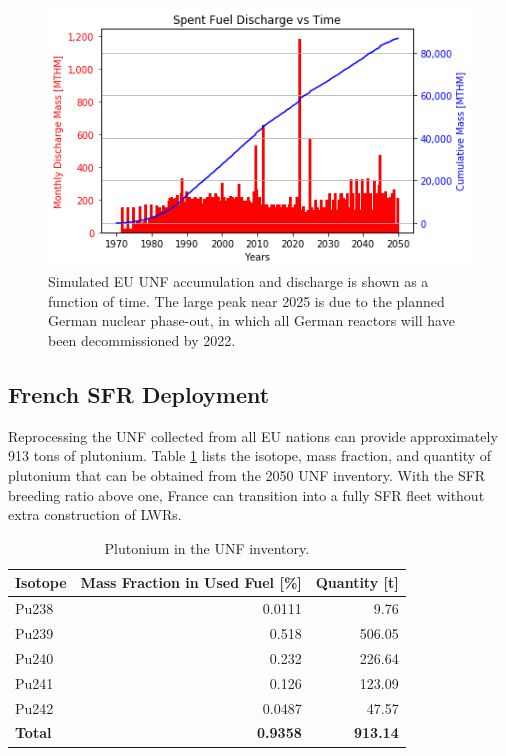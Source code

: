 \begin{figure}[htbp!]
	\begin{center}
			\includegraphics[scale=0.7]{./images/eu_future/snf_discharge.png}
	\end{center}
        \caption{Simulated \gls{EU} \gls{UNF} accumulation and discharge is 
shown as a function of time. The large peak near 2025 is due to the planned German
nuclear phase-out, in which all German reactors will have been decommissioned by 2022.}
	\label{fig:eu_snf}
\end{figure}


\subsection{French \gls{SFR} Deployment}
\FloatBarrier

Reprocessing the \gls{UNF} collected from all EU nations can provide
approximately 913 tons of plutonium. Table \ref{tab:pu} lists the 
isotope, mass fraction, and quantity of plutonium that can be obtained from the 
2050 \gls{UNF} inventory.  With the \gls{SFR} breeding ratio above one, France 
can transition into a fully \gls{SFR} fleet without extra construction of 
\glspl{LWR}. 

\begin{table}[h]
	\centering
	\caption{Plutonium in the \gls{UNF} inventory.}
	\begin{tabular}{lrr}
		\hline
		\textbf{Isotope} & \textbf{Mass Fraction in Used Fuel [\%]} & \textbf{Quantity [t]} \\ \hline
		Pu238 & 0.0111 & 9.76 \\ 
		Pu239 & 0.518 & 506.05 \\ 
		Pu240 & 0.232 & 226.64 \\ 
		Pu241 & 0.126 & 123.09 \\ 
		Pu242 & 0.0487 & 47.57 \\ \hline
		\textbf{Total} & \textbf{0.9358} & \textbf{913.14} \\ \hline
	\end{tabular}
	
	\label{tab:pu}
\end{table}

